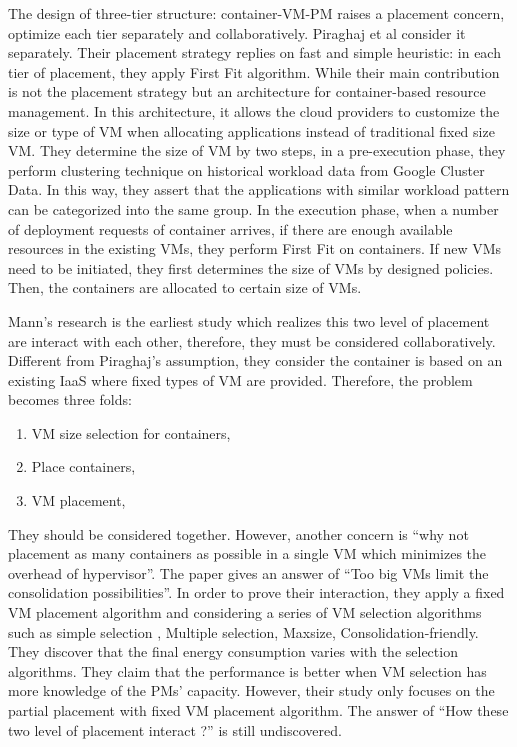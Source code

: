 The design of three-tier structure: container-VM-PM raises a placement concern, optimize each tier separately and collaboratively.
Piraghaj et al \cite{Piraghaj:2016bw} consider it separately. Their placement strategy replies on fast and simple heuristic: in each tier of placement, they apply First Fit algorithm. While their main contribution is not the placement strategy but an architecture for container-based resource management. In this architecture, it allows the cloud providers to customize the size or type of VM when allocating applications instead of traditional fixed size VM. They determine the size of VM by two steps, in a pre-execution phase, they perform clustering technique on historical workload data from Google Cluster Data. In this way, they assert that the applications with similar workload pattern can be categorized into the same group. In the execution phase, when a number of deployment requests of container arrives, if there are enough available resources in the existing VMs, they perform First Fit on containers. If new VMs need to be initiated, they first determines the size of VMs by designed policies. Then, the containers are allocated to certain size of VMs. 

Mann's research \cite{Mann:2016hx} is the earliest study which realizes this two level of placement are interact with each other, therefore, they must be considered collaboratively. Different from Piraghaj's assumption, they consider the container is based on an existing IaaS where fixed types of VM are provided. Therefore, the problem becomes three folds: 
\begin{enumerate}

	\item VM size selection for containers, 
	\item Place containers, 
	\item VM placement, 
\end{enumerate}
They should be considered together. However, another concern is ``why not placement as many containers as possible in a single VM which minimizes the overhead of hypervisor''. The paper gives an answer of ``Too big VMs limit the consolidation possibilities''.  In order to prove their interaction, they apply a fixed VM placement algorithm and considering a series of VM selection algorithms such as simple selection \cite{Ganesan:2012eb},  Multiple selection, Maxsize, Consolidation-friendly. They discover that the final energy consumption varies with the selection algorithms. They claim that the performance is better when VM selection has more knowledge of the PMs' capacity. However, their study only focuses on the partial placement with fixed VM placement algorithm. The answer of ``How these two level of placement interact ?'' is still undiscovered.

